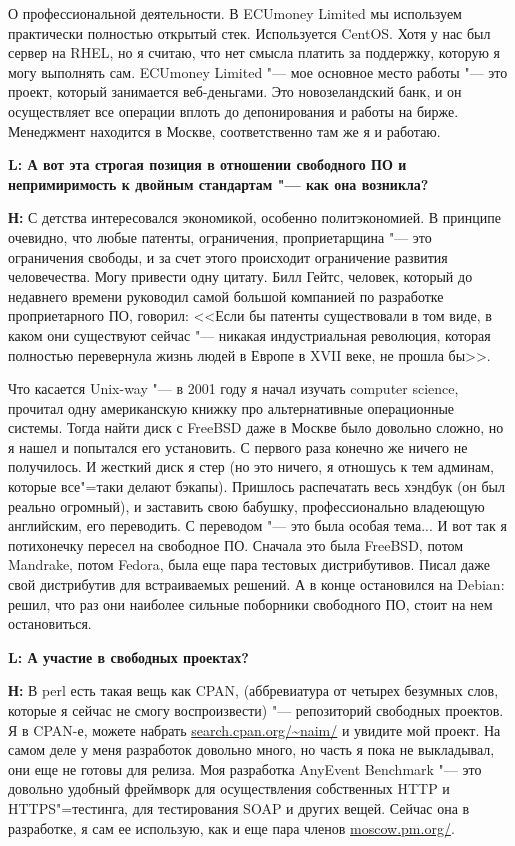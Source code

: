\documentclass[10pt, a5paper]{article}
\begin{document}
О профессиональной деятельности. В ECUmoney Limited мы используем практически полностью открытый стек. Используется CentOS. Хотя у нас был сервер на RHEL, но я считаю, что нет смысла платить за поддержку, которую я могу выполнять сам. ECUmoney Limited "--- мое основное место работы "--- это проект, который занимается веб-деньгами. Это новозеландский банк, и он осуществляет все операции вплоть до депонирования и работы на бирже. Менеджмент находится в Москве, соответственно там же я и работаю. 

{\noindent \bf L: А вот эта строгая позиция в отношении свободного ПО и непримиримость к двойным стандартам "--- как она возникла?}

{\noindent \bf Н:} С детства интересовался экономикой, особенно политэкономией. В принципе очевидно, что любые патенты, ограничения, проприетарщина "--- это ограничения свободы, и за счет этого происходит ограничение развития человечества. Могу привести одну цитату. Билл Гейтс, человек, который до недавнего времени руководил самой большой компанией по разработке проприетарного ПО, говорил: <<Если бы патенты существовали в том виде, в каком они существуют сейчас "--- никакая индустриальная революция, которая полностью перевернула жизнь людей в Европе в XVII веке, не прошла бы>>.

Что касается Unix-way "--- в 2001 году я начал изучать computer science, прочитал одну американскую книжку про альтернативные операционные системы. Тогда найти диск с FreeBSD даже в Москве было довольно сложно, но я нашел и попытался его установить. С первого раза конечно же ничего не получилось.  И жесткий диск я стер (но это ничего, я отношусь к тем админам, которые все"=таки делают бэкапы). Пришлось распечатать весь хэндбук (он был реально огромный), и заставить свою бабушку, профессионально владеющую английским, его переводить. С переводом "--- это была особая тема...  И вот так я потихонечку пересел на свободное ПО. Сначала это была FreeBSD, потом Mandrake, потом Fedora, была еще пара тестовых дистрибутивов. Писал даже свой дистрибутив для встраиваемых решений. А в конце остановился на Debian: решил, что раз они наиболее сильные поборники свободного ПО, стоит на нем остановиться.

{\noindent \bf L: А участие в свободных проектах?}

{\noindent \bf Н:} В perl есть такая вещь как CPAN, (аббревиатура от четырех безумных слов, которые я сейчас не смогу воспроизвести) "--- репозиторий свободных проектов. Я в CPAN-е, можете набрать \url{search.cpan.org/~naim/} и увидите мой проект. На самом деле у меня разработок довольно много, но часть я пока не выкладывал, они еще не готовы для релиза. Моя разработка AnyEvent Benchmark "--- это довольно удобный фреймворк для осуществления собственных HTTP и HTTPS"=тестинга, для тестирования SOAP и других вещей. Сейчас она в разработке, я сам ее использую, как и еще пара членов \url{moscow.pm.org/}.
\end{document}
